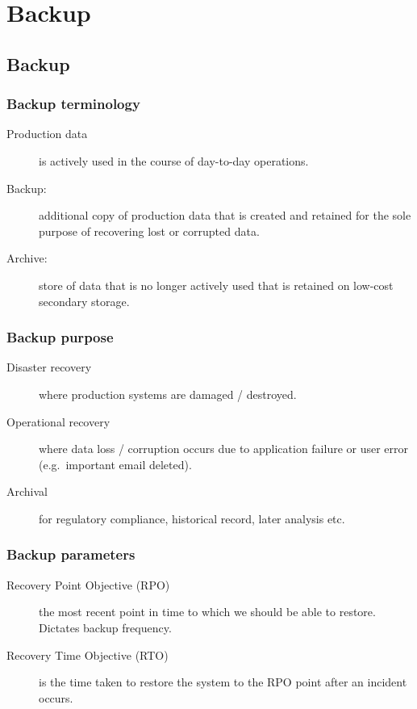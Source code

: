 \chapter{Backup}
\label{ch:backup}

\section{Backup}
\label{sec:backup}

\subsection{Backup terminology}
\label{sec:backup-terminology}

\begin{description}
\item[Production data]
is actively used in the course of day-to-day operations.
\item[Backup:]
additional copy of production data that is created and retained for the
sole purpose of recovering lost or corrupted data.
\item[Archive:]
store of data that is no longer actively used that is retained on
low-cost secondary storage.
\end{description}

\subsection{Backup purpose}
\label{sec:backup-purpose}

\begin{description}
\item[Disaster recovery]
where production systems are damaged / destroyed.
\item[Operational recovery]
where data loss / corruption occurs due to application failure or user
error (e.g.~important email deleted).
\item[Archival]
for regulatory compliance, historical record, later analysis etc.
\end{description}

\subsection{Backup parameters}
\label{sec:backup-parameters}

\begin{description}
\item[Recovery Point Objective (RPO)]
the most recent point in time to which we should be able to restore.
Dictates backup frequency.
\item[Recovery Time Objective (RTO)]
is the time taken to restore the system to the RPO point after an
incident occurs.
\end{description}

